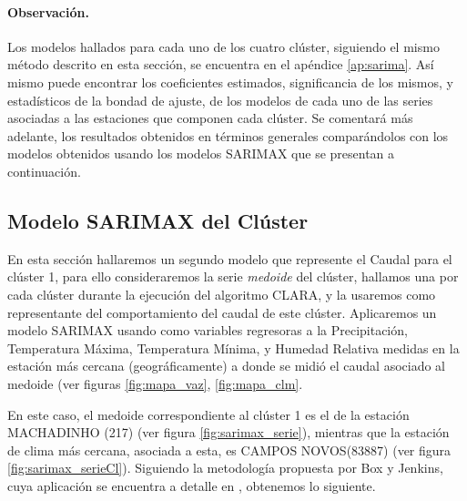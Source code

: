 \documentclass[12pt,oneside]{book}\usepackage[]{graphicx}\usepackage[]{color}
\theoremstyle{definition} %
\begin{document}
\paragraph{Observación.} Los modelos hallados para cada uno de los cuatro clúster, siguiendo el mismo método descrito en esta sección, se encuentra en el apéndice \ref{ap:sarima}. Así mismo puede encontrar los coeficientes estimados, significancia de los mismos, y estadísticos de la bondad de ajuste, de los modelos de cada uno de las series asociadas a las estaciones que componen cada clúster. Se comentará más adelante, los resultados obtenidos en términos generales comparándolos con los modelos obtenidos usando los modelos SARIMAX que se presentan a continuación.








\newpage


\subsection{Modelo SARIMAX del Clúster}

En esta sección hallaremos un segundo modelo que represente el Caudal para el clúster 1, para ello consideraremos la serie \textit{medoide} del clúster, hallamos una por cada clúster durante la ejecución del algoritmo CLARA, y la usaremos como representante del comportamiento del caudal de este clúster. Aplicaremos un modelo SARIMAX usando como variables regresoras a la Precipitación, Temperatura Máxima, Temperatura Mínima, y Humedad Relativa medidas en la estación más cercana (geográficamente) a donde se midió el caudal asociado al medoide (ver figuras \ref{fig:mapa_vaz}, \ref{fig:mapa_clm}.





En este caso, el medoide correspondiente al clúster 1 es el de la estación MACHADINHO (217) (ver figura \ref{fig:sarimax_serie}), mientras que la estación de clima más cercana, asociada a esta, es CAMPOS NOVOS(83887) (ver figura \ref{fig:sarimax_serieCl}). Siguiendo la metodología propuesta por Box y Jenkins, cuya aplicación se encuentra a detalle en \citeauthor{novales1993econometria} \citeyear{novales1993econometria}, obtenemos lo siguiente.
\end{document}
